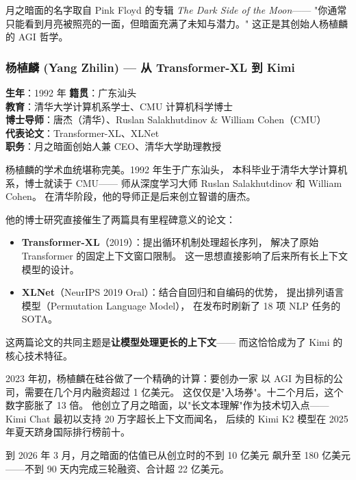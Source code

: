 月之暗面的名字取自 Pink Floyd 的专辑 \textit{The Dark Side of the Moon}——
"你通常只能看到月亮被照亮的一面，但暗面充满了未知与潜力。"
这正是其创始人杨植麟的 AGI 哲学。

\subsubsection{杨植麟 (Yang Zhilin) — 从 Transformer-XL 到 Kimi}

\begin{keybox}
\textbf{生年}：1992 年 \quad \textbf{籍贯}：广东汕头 \\
\textbf{教育}：清华大学计算机系学士、CMU 计算机科学博士 \\
\textbf{博士导师}：唐杰（清华）、Ruslan Salakhutdinov \& William Cohen（CMU） \\
\textbf{代表论文}：Transformer-XL、XLNet \\
\textbf{职务}：月之暗面创始人兼 CEO、清华大学助理教授
\end{keybox}

杨植麟的学术血统堪称完美。1992 年生于广东汕头，
本科毕业于清华大学计算机系，博士就读于 CMU——
师从深度学习大师 Ruslan Salakhutdinov 和 William Cohen。
在清华阶段，他的导师正是后来创立智谱的唐杰。

他的博士研究直接催生了两篇具有里程碑意义的论文：

\begin{itemize}[noitemsep]
  \item \textbf{Transformer-XL}（2019）：提出循环机制处理超长序列，
        解决了原始 Transformer 的固定上下文窗口限制。
        这一思想直接影响了后来所有长上下文模型的设计。
  \item \textbf{XLNet}（NeurIPS 2019 Oral）：结合自回归和自编码的优势，
        提出排列语言模型（Permutation Language Model），
        在发布时刷新了 18 项 NLP 任务的 SOTA。
\end{itemize}

这两篇论文的共同主题是\textbf{让模型处理更长的上下文}——
而这恰恰成为了 Kimi 的核心技术特征。

2023 年初，杨植麟在硅谷做了一个精确的计算：要创办一家
以 AGI 为目标的公司，需要在几个月内融资超过 1 亿美元。
这仅仅是"入场券"。十二个月后，这个数字膨胀了 13 倍。
他创立了月之暗面，以"长文本理解"作为技术切入点——
Kimi Chat 最初以支持 20 万字超长上下文而闻名，
后续的 Kimi K2 模型在 2025 年夏天跻身国际排行榜前十。

到 2026 年 3 月，月之暗面的估值已从创立时的不到 10 亿美元
飙升至 180 亿美元——不到 90 天内完成三轮融资、合计超 22 亿美元。

